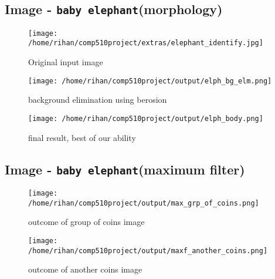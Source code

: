 \pagebreak
\subsection{Image - \texttt{baby elephant}(morphology) }
\begin{figure}[h!]
  \centering
  \texttt{[image: /home/rihan/comp510project/extras/elephant\_identify.jpg]}
  \caption{Original input image}
\end{figure}
\begin{figure}[h!]
  \centering
  \texttt{[image: /home/rihan/comp510project/output/elph\_bg\_elm.png]}
  \caption{background elimination using berosion}
\end{figure}

\begin{figure}[h!]
  \centering
  \texttt{[image: /home/rihan/comp510project/output/elph\_body.png]}
  \caption{final result, best of our ability}
\end{figure}

\subsection{Image - \texttt{baby elephant}(maximum filter) }
\begin{figure}[h!]
  \centering
  \texttt{[image: /home/rihan/comp510project/output/max\_grp\_of\_coins.png]}
  \caption{outcome of group of coins image}
\end{figure}

\begin{figure}[h!]
  \centering
  \texttt{[image: /home/rihan/comp510project/output/maxf\_another\_coins.png]}
  \caption{outcome of another coins image}
\end{figure}

